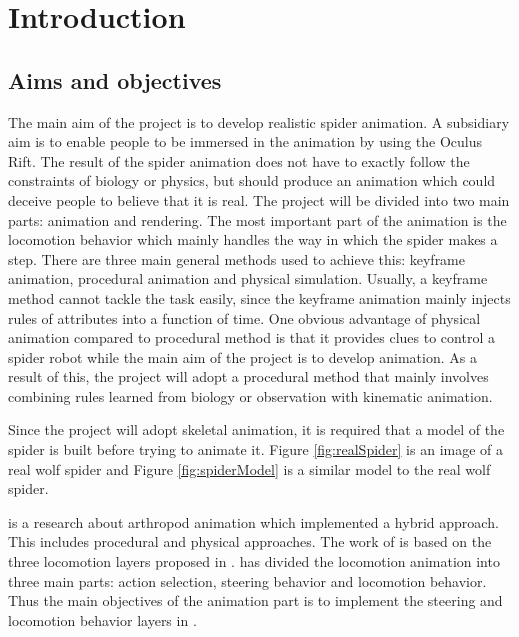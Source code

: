 \chapter{Introduction}
\section{Aims and objectives}
The main aim of the project is to develop realistic spider animation. A subsidiary aim is to enable people to be immersed in the animation by using the Oculus Rift. The result of the spider animation does not have to exactly follow the constraints of biology or physics, but should produce an animation which could deceive people to believe that it is real. 
The project will be divided into two main parts: animation and rendering. 
The most important part of the animation is the locomotion behavior which mainly handles the way in which the spider makes a step. 
There are three main general methods used to achieve this: keyframe animation, procedural animation and physical simulation. Usually, a keyframe method cannot tackle the task easily, since the keyframe animation mainly injects rules of attributes into a function of time.  One obvious advantage of physical animation compared to procedural method is that it provides clues to control a spider robot while the main aim of the project is to develop animation. As a result of this, the project will adopt a procedural method that mainly involves combining rules learned from biology or observation with kinematic animation.  



Since the project will adopt skeletal animation, it is required that a model of the spider is built before trying to animate it. Figure  \ref{fig:realSpider} is an image of a real wolf spider and Figure \ref{fig:spiderModel} is a similar model to the real wolf spider.




\cite{thesis} is a research about arthropod animation which implemented a hybrid approach. This includes procedural and physical approaches. The work of \cite{thesis} is based on the three locomotion layers proposed in \cite{steering}. \cite{steering} has divided the locomotion animation into three main parts: action selection, steering behavior and locomotion behavior. Thus the main objectives of the animation part is to implement the steering and locomotion behavior layers in \cite{steering}.




